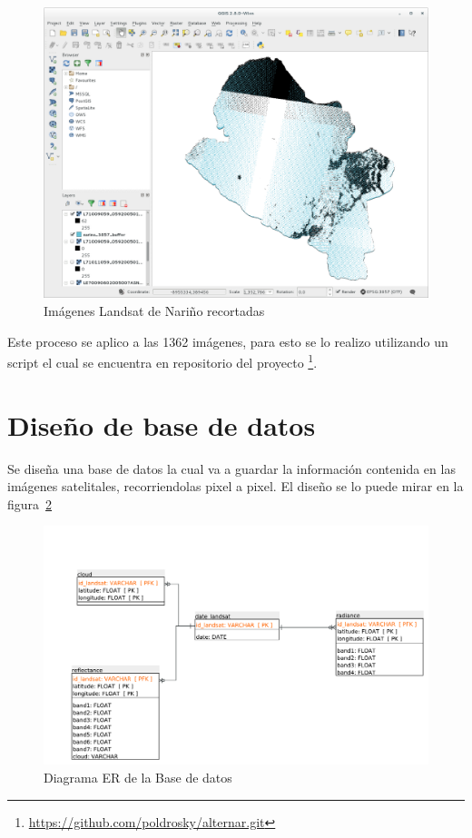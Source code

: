 \begin{figure}[!htb]
  \centering
  \includegraphics[width=12cm]{pictures/bio2.png}
  \caption{Imágenes Landsat de Nariño recortadas}
  \label{fig:bio2}
\end{figure}

Este proceso se aplico a las 1362 imágenes, para esto se lo realizo utilizando un script el cual se encuentra en repositorio del proyecto
\footnote{\url{https://github.com/poldrosky/alternar.git}}.


\section{Diseño de base de datos}

Se diseña una base de datos la cual va a guardar la información contenida en las imágenes satelitales, recorriendolas pixel a pixel. El diseño se lo puede mirar
en la figura~\ref{fig:dise}

\begin{figure}[!htb]
  \centering
  \includegraphics[width=12cm]{pictures/diagramaER.pdf}
  \caption{Diagrama ER de la Base de datos}
  \label{fig:dise}
\end{figure}


